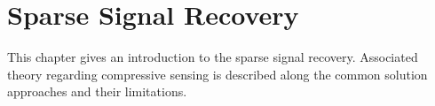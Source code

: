 \chapter{Sparse Signal Recovery}
This chapter gives an introduction to the sparse signal recovery. Associated theory regarding compressive sensing is described along  the common solution approaches and their limitations. 
    






